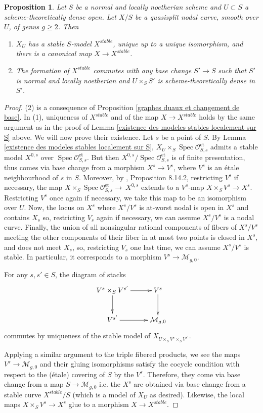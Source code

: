 \documentclass[a4paper,12pt]{amsart} %
\numberwithin{equation}{subsection}
\newcommand{\on}[1]{\operatorname{#1}}
\newcommand{\Spec}{\operatorname{Spec}}
\theoremstyle{definition}
\theoremstyle{plain}%
\newtheorem{proposition}[definition]{Proposition}
\theoremstyle{remark}
\renewcommand{\O}{\mathcal{O}}
\begin{document}
\begin{proposition}\label{proposition existence and structure of the stable model}
Let $S$ be a normal and locally noetherian scheme and $U\subset S$ a scheme-theoretically dense open. Let $X/S$ be a quasisplit nodal curve, smooth over $U$, of genus $g\geq 2$. Then
\begin{enumerate}
\item $X_U$ has a stable $S$-model $X^{stable}$, unique up to a unique isomorphism, and there is a canonical map $X\to X^{stable}$.
\item The formation of $X^{stable}$ commutes with any base change $S'\to S$ such that $S'$ is normal and locally noetherian and $U\times_S S'$ is scheme-theoretically dense in $S'$.
\end{enumerate}
\end{proposition}

\begin{proof}
(2) is a consequence of Proposition \ref{graphes duaux et changement de base}. In (1), uniqueness of $X^{stable}$ and of the map $X\to X^{stable}$ holds by the same argument as in the proof of Lemma \ref{existence des modeles stables localement sur S} above. We will now prove their existence. Let $s$ be a point of $S$. By Lemma \ref{existence des modeles stables localement sur S}, $X_U\times_S\Spec\O_{S,s}^{\on{et}}$ admits a stable model $X^{0,s}$ over $\Spec\O_{S,s}^{\on{et}}$. But then $X^{0,s}/\Spec\O_{S,s}^{\on{et}}$ is of finite presentation, thus comes via base change from a morphism $X^{s}\to V^s$, where $V^s$ is an \'etale neighbourhood of $s$ in $S$. Moreover, by \cite{EGA4.3}, Proposition 8.14.2, restricting $V^s$ if necessary, the map $X\times_S\Spec\O_{S,s}^{\on{et}}\to~X^{0,s}$ extends to a $V^s$-map $X\times_S V^s\to X^s$. Restricting $V^s$ once again if necessary, we take this map to be an isomorphism over $U$. Now, the locus on $X^s$ where $X^s/V^s$ is at-worst nodal is open in $X^s$ and contains $X_s$ so, restricting $V_s$ again if necessary, we can assume $X^s/V^s$ is a nodal curve. Finally, the union of all nonsingular rational components of fibers of $X^s/V^s$ meeting the other components of their fiber in at most two points is closed in $X^s$, and does not meet $X_s$, so, restricting $V_s$ one last time, we can assume $X^s/V^s$ is stable. In particular, it corresponds to a morphism $V^s\to \mathcal{M}_{g,0}$.

For any $s,s'\in S$, the diagram of stacks
\[
\xymatrix{
V^s\times_S V^{s'}\ar[r]\ar[d]&V^s\ar[d]\\
V^{s'}\ar[r]&\mathcal{M}_{g,0}
}
\]
commutes by uniqueness of the stable model of $X_{U\times_S V^s\times_S V^{s'}}$.

Applying a similar argument to the triple fibered products, we see the maps $V^s\to \mathcal{M}_{g,0}$ and their gluing isomorphisms satisfy the cocycle condition with respect to the (\'etale) covering of $S$ by the $V^s$. Therefore, they come via base change from a map $S\to \mathcal{M}_{g,0}$ i.e. the $X^s$ are obtained via base change from a stable curve $X^{stable}/S$ (which is a model of $X_U$ as desired). Likewise, the local maps $X\times_S V^s\to X^s$ glue to a morphism $X\to X^{stable}$.
\end{proof}
\end{document}

